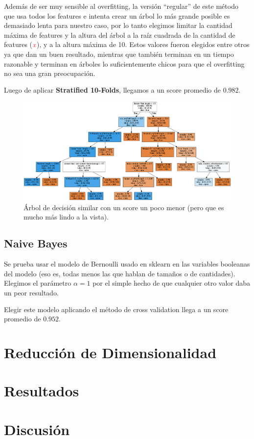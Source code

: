 \documentclass[a4paper, 11pt]{article}
\newcommand{\todox}{\(\mathit{\color{red}x}\)}
\begin{document}
Además de ser muy sensible al overfitting, la versión ``regular'' de este método que usa todos los features e intenta crear un árbol lo más grande posible es demasiado lenta para nuestro caso, por lo tanto elegimos limitar la cantidad máxima de features y la altura del árbol a la raíz cuadrada de la cantidad de features (\todox{}), y a la altura máxima de 10. Estos valores fueron elegidos entre otros ya que dan un buen resultado, mientras que también terminan en un tiempo razonable y terminan en árboles lo suficientemente chicos para que el overfitting no sea una gran preocupación.

Luego de aplicar \textbf{Stratified 10-Folds}, llegamos a un score promedio de \( \mathbf{0.982} \).

\begin{figure}
	\centerline{\includegraphics[width=1.3\textwidth]{tree.png}}
	\caption{Árbol de decisión similar con un score un poco menor (pero que es mucho más lindo a la vista).}
\end{figure}

\subsection{Naive Bayes}

Se prueba usar el modelo de Bernoulli usado en sklearn en las variables booleanas del modelo (eso es, todas menos las que hablan de tamaños o de cantidades). Elegimos el parámetro \( \alpha = 1 \) por el simple hecho de que cualquier otro valor daba un peor resultado.

Elegir este modelo aplicando el método de cross validation llega a un score promedio de \( \mathbf{0.952} \).

\section{Reducción de Dimensionalidad}

\section{Resultados}

\section{Discusión}
\end{document}
